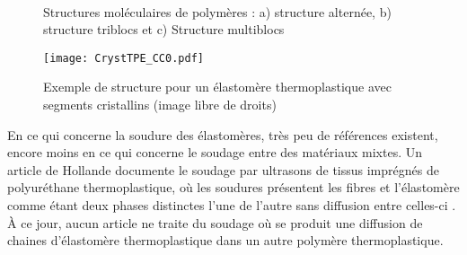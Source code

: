 \vspace{6pt}
\begin{figure}[h]
	\subfigcapskip=6pt
	\centering
	 \quad
	 \\ \vspace{6pt}
	\caption{Structures moléculaires de polymères : a) structure alternée, b) structure triblocs et c) Structure multiblocs}
	\label{fig:polymere_structure}
\end{figure}

\begin{figure}[h]
	\centering
	\texttt{[image: CrystTPE\_CC0.pdf]}
	\caption{Exemple de structure pour un élastomère thermoplastique avec segments cristallins (image libre de droits)}
	\label{fig:structure_TPECryst}
\end{figure}

\FloatBarrier
En ce qui concerne la soudure des élastomères, très peu de références existent, encore moins en ce qui concerne le soudage entre des matériaux mixtes. 
Un article de Hollande documente le soudage par ultrasons de tissus imprégnés de polyuréthane thermoplastique, où les soudures présentent les fibres et l'élastomère comme étant deux phases distinctes l'une de l'autre sans diffusion entre celles-ci \cite{Hollande1998}. 
À ce jour, aucun article ne traite du soudage où se produit une diffusion de chaines d'élastomère thermoplastique dans un autre polymère thermoplastique. 

